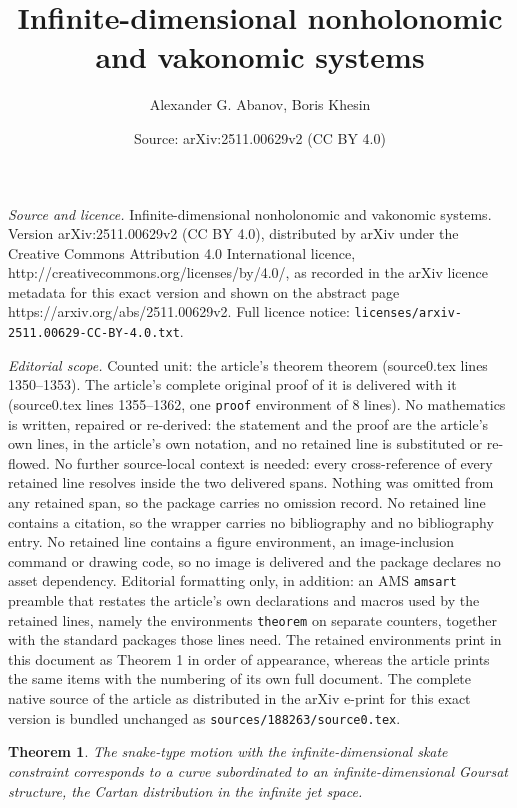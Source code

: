 \documentclass[10pt,a4paper]{amsart}
\title{Infinite-dimensional nonholonomic and vakonomic systems}
\author{Alexander G. Abanov, Boris Khesin}
\date{Source: arXiv:2511.00629v2 (CC BY 4.0)}
\newtheorem{theorem}{Theorem}
\begin{document}
\maketitle

\noindent\emph{Source and licence.} Infinite-dimensional nonholonomic and vakonomic systems. Version arXiv:2511.00629v2 (CC BY 4.0), distributed by arXiv under the Creative Commons Attribution 4.0 International licence, http://creativecommons.org/licenses/by/4.0/, as recorded in the arXiv licence metadata for this exact version and shown on the abstract page https://arxiv.org/abs/2511.00629v2. Full licence notice: \texttt{licenses/arxiv-2511.00629-CC-BY-4.0.txt}.\par\smallskip

\noindent\textit{Editorial scope.} Counted unit: the article's theorem theorem (source0.tex lines 1350--1353). The article's complete original proof of it is delivered with it (source0.tex lines 1355--1362, one \texttt{proof} environment of 8 lines). No mathematics is written, repaired or re-derived: the statement and the proof are the article's own lines, in the article's own notation, and no retained line is substituted or re-flowed.  No further source-local context is needed: every cross-reference of every retained line resolves inside the two delivered spans.  Nothing was omitted from any retained span, so the package carries no omission record.  No retained line contains a citation, so the wrapper carries no bibliography and no bibliography entry.  No retained line contains a figure environment, an image-inclusion command or drawing code, so no image is delivered and the package declares no asset dependency.  Editorial formatting only, in addition: an AMS \texttt{amsart} preamble that restates the article's own declarations and macros used by the retained lines, namely the environments \texttt{theorem} on separate counters, together with the standard packages those lines need.  The retained environments print in this document as Theorem 1 in order of appearance, whereas the article prints the same items with the numbering of its own full document.  The complete native source of the article as distributed in the arXiv e-print for this exact version is bundled unchanged as \texttt{sources/188263/source0.tex}.
\begin{theorem}
The snake-type motion with the  infinite-dimensional skate constraint
corresponds to a curve subordinated to an  infinite-dimensional  Goursat structure, the Cartan distribution in the infinite jet space.
\end{theorem}
\end{document}
